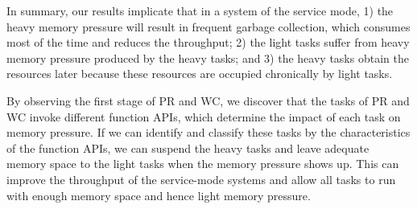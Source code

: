 In summary, our results implicate that in a system of the service mode, 1) the heavy memory pressure will result in frequent garbage collection, which consumes most of the time and reduces the throughput; 2) the light tasks suffer from heavy memory pressure produced by the heavy tasks; and 3) the heavy tasks obtain the resources later because these resources are occupied chronically by light tasks. %

By observing the first stage of PR and WC, we discover that the tasks of PR and WC invoke different function APIs, which determine the impact of each task on memory pressure. If we can identify and classify these tasks by the characteristics of the function APIs, we can suspend the heavy tasks and leave adequate memory space to the light tasks when the memory pressure shows up. This can improve the throughput of the service-mode systems and allow all tasks to run with enough memory space and hence light memory pressure.



